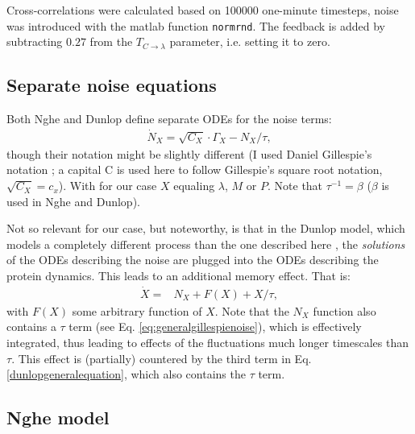 %
Cross-correlations were calculated based on 100000 one-minute timesteps, noise was introduced with the matlab function \texttt{normrnd}.
% 
The feedback is added by subtracting $0.27$ from the $T_{C\rightarrow\lambda}$ parameter, i.e. setting it to zero.

\subsection*{Separate noise equations}

Both Nghe and Dunlop define separate ODEs for the noise terms:
%
\begin{align}
\label{eq:generalgillespienoise}
\dot{N}_X = \sqrt{C_X} \cdot \Gamma_X - N_X/\tau
,
\end{align}
%
though their notation might be slightly different (I used Daniel Gillespie's notation \cite{Gillespie1996}; a capital C is used here to follow Gillespie's square root notation, $\sqrt{C_X}=c_x$).
With for our case $X$ equaling $\lambda$, $M$ or $P$. Note that $\tau^{-1}=\beta$ ($\beta$ is used in Nghe and Dunlop).

Not so relevant for our case, but noteworthy, is that in the Dunlop model, which models a completely different process than the one described here \cite{Dunlop2008}, the \textit{solutions} of the ODEs describing the noise are plugged into the ODEs describing the protein dynamics. This leads to an additional memory effect.
%
That is:
%
\begin{align}
\label{dunlopgeneralequation}
\dot{X} = & N_X  + F(X) + X/\tau
,
\end{align}
%
with $F(X)$ some arbitrary function of $X$. 
Note that the $N_X$ function also contains a $\tau$ term (see Eq. \ref{eq:generalgillespienoise}), which is effectively integrated, thus leading to effects of the fluctuations much longer timescales than $\tau$. 
This effect is (partially) countered by the third term in Eq. \ref{dunlopgeneralequation}, which also contains the $\tau$ term.

\subsection*{Nghe model}

